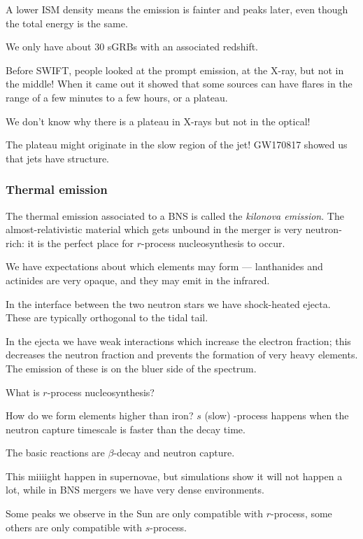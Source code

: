 \documentclass[main.tex]{subfiles}
\begin{document}
A lower ISM density means the emission is fainter and peaks later,
even though the total energy is the same.

We only have about 30 sGRBs with an associated redshift. 

Before SWIFT, people looked at the prompt emission, at the X-ray, but 
not in the middle! 
When it came out it showed that some sources can have flares
in the range of a few minutes to a few hours, or a plateau. 

We don't know why there is a plateau in X-rays but not in the optical! 

The plateau might originate in the slow region of the jet! 
GW170817 showed us that jets have structure. 

\subsubsection{Thermal emission}

The thermal emission associated to a BNS is called the \emph{kilonova emission}. 
The almost-relativistic material which gets unbound in the merger is very neutron-rich:
it is the perfect place for \(r\)-process nucleosynthesis to occur. 

We have expectations about which elements may form ---
lanthanides and actinides are very opaque, and they may emit in the infrared.  

In the interface between the two neutron stars we have shock-heated ejecta. 
These are typically orthogonal to the tidal tail. 

In the ejecta we have weak interactions which increase the electron fraction;
this decreases the neutron fraction and prevents the formation of very heavy elements. 
The emission of these is on the bluer side of the spectrum. 

What is \(r\)-process nucleosynthesis?

How do we form elements higher than iron? 
\(s\) (slow) -process happens when the neutron capture timescale is faster 
than the decay time. 

The basic reactions are \(\beta \)-decay and neutron capture. 

This miiiight happen in supernovae, but simulations show it will not happen a lot,
while in BNS mergers we have very dense environments. 

Some peaks we observe in the Sun are only compatible with \(r\)-process, 
some others are only compatible with \(s\)-process. 
\end{document}
